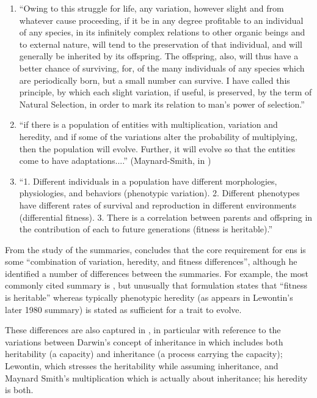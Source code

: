 \begin{enumerate}
\item
``Owing to this struggle for life, any variation, however slight and from whatever cause proceeding, if it be in any degree profitable to an individual of any species, in its infinitely complex relations to other organic beings and to external nature, will tend to the preservation of that individual, and will generally be inherited by its offspring. The offspring, also, will thus have a better chance of surviving, for, of the many individuals of any species which are periodically born, but a small number can survive. I have called this principle, by which each slight variation, if useful, is preserved, by the term of Natural Selection, in order to mark its relation to man's power of selection.'' \cite{Darwin1859}

\item
``if there is a population of entities with multiplication, variation and heredity, and if some of the variations alter the probability of multiplying, then the population will evolve. Further, it will evolve so that the entities come to have adaptations....'' (Maynard-Smith, in \cite{Griesemer2001})

\item
``1. Different individuals in a population have different morphologies, physiologies, and behaviors (phenotypic variation). 2. Different phenotypes have different rates of survival and reproduction in different environments (differential fitness). 3. There is a correlation between parents and offspring in the contribution of each to future generations (fitness is heritable).'' \cite{Lewontin:1970mc}

\end{enumerate}

From the study of the summaries, \cite{Godfrey-Smith2007} concludes that the core requirement for \gls{ens} is some ``combination of variation, heredity, and fitness differences'', although he identified a number of differences between the summaries. For example, the most commonly cited summary is \cite{Lewontin:1970mc}, but unusually that formulation states that ``fitness is heritable'' whereas typically phenotypic heredity (as appears in Lewontin's later 1980 summary) is stated as sufficient for a trait to evolve. 

These differences are also captured in \parencite{Griesemer2001}, in particular with reference to the variations between Darwin's concept of inheritance in \cite{Darwin1859} which includes both heritability (a capacity) and inheritance (a process carrying the capacity); Lewontin, which stresses the heritability while assuming inheritance, and Maynard Smith's multiplication which is actually about inheritance; his heredity is both. \parencite{Griesemer2001}

